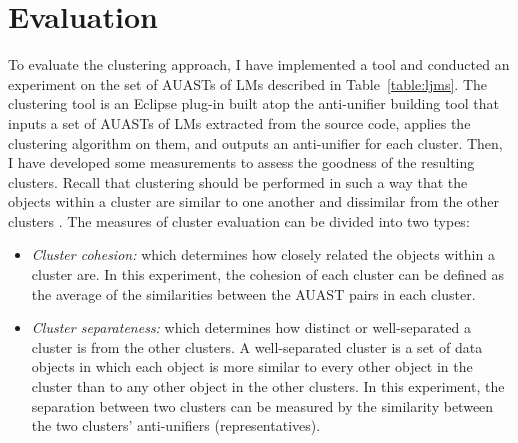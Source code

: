 \section{Evaluation} \label{clustering-evaluation}
To evaluate the clustering approach, I have implemented a tool and conducted an experiment on the set of AUASTs of LMs described in Table~\ref{table:ljms}. The clustering tool is an Eclipse plug-in built atop the anti-unifier building tool that inputs a set of AUASTs of LMs extracted from the source code, applies the clustering algorithm on them, and outputs an anti-unifier for each cluster. Then, I have developed some measurements to assess the goodness of the resulting clusters. Recall that clustering should be performed in such a way that the objects within a cluster are similar to one another and dissimilar from the other clusters \cite{tan2005data}. The measures of cluster evaluation can be divided into two types:

\begin{itemize} [leftmargin=0.4in]
\item \emph{Cluster cohesion:} which determines how closely related the objects within a cluster are. In this experiment, the cohesion of each cluster can be defined as the average of the similarities between the AUAST pairs in each cluster.
\item \emph{Cluster separateness:} which determines how distinct or well-separated a cluster is from the other clusters. A well-separated cluster is a set of data objects in which each object is more similar to every other object in the cluster than to any other object in the other clusters.  In this experiment, the separation between two clusters can be measured by the similarity between the two clusters' anti-unifiers (representatives).
\end{itemize}

